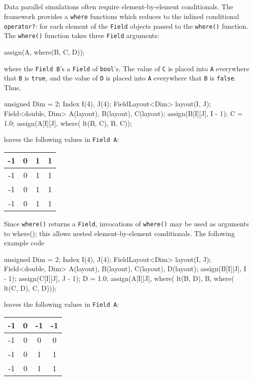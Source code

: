 \subsection{}

Data parallel simulations often require element-by-element conditionals. The \ippl framework provides a \texttt{where} functions which reduces to the inlined conditional \texttt{operator?}: for each element of the \texttt{Field} objects passed to the \texttt{where()} function. The \texttt{where()} function takes three \texttt{Field} arguments:
\begin{smallcode}
assign(A, where(B, C, D));
\end{smallcode}
where the \texttt{Field B}'s a \texttt{Field} of \texttt{bool}'s. The value of \texttt{C} is placed into \texttt{A} everywhere that \texttt{B} is \texttt{true}, and the value of \texttt{D} is placed into \texttt{A} everywhere that \texttt{B} is \texttt{false}. Thus, \\
\begin{code}
unsigned Dim = 2;
Index I(4), J(4);
FieldLayout<Dim> layout(I, J);
Field<double, Dim> A(layout), B(layout), C(layout);
assign(B[I][J], I - 1);
C = 1.0;
assign(A[I][J], where( lt(B, C), B, C));
\end{code}
leaves the following values in \texttt{Field A}:
%
   \begin{center}
        \begin{tabular}{|c|c|c|c|}
        \hline
        -1 & 0 & 1 & 1 \\        \hline
        -1 & 0 & 1 & 1 \\        \hline
        -1 & 0 & 1 & 1 \\        \hline
        -1 & 0 & 1 & 1  \\        \hline
        \end{tabular}
   \end{center}

Since \texttt{where()} returns a \texttt{Field}, invocations of \texttt{where()} may be used as arguments to where(); this allows nested element-by-element conditionals. The following example code\\
\begin{code}
unsigned Dim = 2;
Index I(4), J(4);
FieldLayout<Dim> layout(I, J);
Field<double, Dim> A(layout), B(layout), C(layout), D(layout);
assign(B[I][J], I - 1);
assign(C[I][J], J - 1);
D = 1.0;
assign(A[I][J], where( lt(B, D), B, where( lt(C, D), C, D)));
\end{code}
leaves the following values in \texttt{Field A}:
%
   \begin{center}
        \begin{tabular}{|c|c|c|c|}
        \hline
        -1 & 0 & -1 & -1 \\        \hline
        -1 & 0 & 0 & 0 \\        \hline
        -1 & 0 & 1 & 1 \\        \hline
        -1 & 0 & 1 & 1  \\        \hline
        \end{tabular}
   \end{center}

